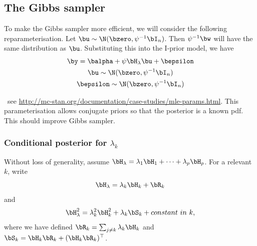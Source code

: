\documentclass[english, 11pt]{article}
\begin{document}
\subsection{The Gibbs sampler}

To make the Gibbs sampler more efficient, we will consider the following reparameterisation. Let $\bu \sim \N(\bzero, \psi^{-1} \bI_n)$. Then $\psi^{-1}\bw$ will have the same distribution as $\bu$. Substituting this into the I-prior model, we have
\begin{align}\label{eq:iprioru}
\begin{gathered}
	\by = \balpha + \psi\Hlam\bu + \bepsilon \\
	\bu \sim \N (\bzero, \psi^{-1}\bI_n) \\
	\bepsilon \sim \N (\bzero, \psi^{-1}\bI_n)
\end{gathered}
\end{align}

 \ see \url{http://mc-stan.org/documentation/case-studies/mle-params.html}. This parameterisation allows conjugate priors so that the posterior is a known pdf. This should improve Gibbs sampler.

\subsubsection{Conditional posterior for $\lambda_k$}

Without loss of generality, assume $\Hlam = \lambda_1\bH_1 + \dots + \lambda_p\bH_p$. For a relevant $k$, write
\[
	\Hlam = \lambda_k\bH_k + \bR_k
\]
and
\[
	\Hlam^2 = \lambda_k^2\bH_k^2 + \lambda_k\bS_k + constant \ in \ k,
\]
where we have defined $\bR_k = \sum_{j\neq k}\lambda_k \bH_k$ and $\bS_k = \bH_k\bR_k + (\bH_k\bR_k)^\top$.
\end{document}
